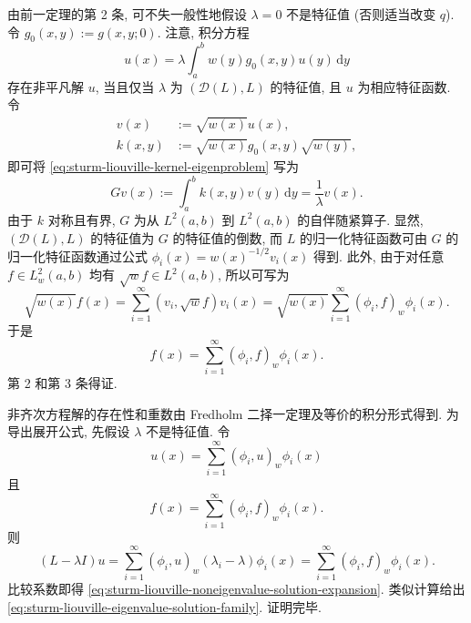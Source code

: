 \begin{Proof}
由前一定理的第 2 条, 可不失一般性地假设 $\lambda=0$ 不是特征值 (否则适当改变 $q$). 令 $g_0(x,y):=g(x,y;0)$. 注意, 积分方程
\begin{equation}\label{eq:sturm-liouville-kernel-eigenproblem}
u(x)=\lambda\int_a^bw(y)g_0(x,y)u(y)\,\mathrm{d}y
\end{equation}
存在非平凡解 $u$, 当且仅当 $\lambda$ 为 $(\mathcal{D}(L),L)$ 的特征值, 且 $u$ 为相应特征函数. 令\[\begin{aligned}
v(x)&:=\sqrt{w(x)}u(x),\\
k(x,y)&:=\sqrt{w(x)}g_0(x,y)\sqrt{w(y)},
\end{aligned}\]即可将 \eqref{eq:sturm-liouville-kernel-eigenproblem} 写为
\begin{equation}\label{eq:sturm-liouville-unweighted-compact-eigenproblem}
Gv(x):=\int_a^bk(x,y)v(y)\,\mathrm{d}y=\dfrac{1}{\lambda}v(x).
\end{equation}
由于 $k$ 对称且有界, $G$ 为从 $L^2(a,b)$ 到 $L^2(a,b)$ 的自伴随紧算子. 显然, $(\mathcal{D}(L),L)$ 的特征值为 $G$ 的特征值的倒数, 而 $L$ 的归一化特征函数可由 $G$ 的归一化特征函数通过公式 $\phi_i(x)=w(x)^{-1/2}v_i(x)$ 得到. 此外, 由于对任意 $f\in L_w^2(a,b)$ 均有 $\sqrt{w}f\in L^2(a,b)$, 所以可写为
\begin{equation}\label{eq:sturm-liouville-weighted-data-basis-expansion}
\sqrt{w(x)}f(x)=\sum_{i=1}^\infty(v_i,\sqrt{w}f)v_i(x)=\sqrt{w(x)}\sum_{i=1}^\infty(\phi_i,f)_w\phi_i(x).
\end{equation}
于是
\begin{equation}\label{eq:sturm-liouville-data-eigenfunction-expansion}
f(x)=\sum_{i=1}^\infty(\phi_i,f)_w\phi_i(x).
\end{equation}
第 2 和第 3 条得证.

非齐次方程解的存在性和重数由 Fredholm 二择一定理及等价的积分形式得到. 为导出展开公式, 先假设 $\lambda$ 不是特征值. 令
\begin{equation}\label{eq:sturm-liouville-solution-basis-expansion}
u(x)=\sum_{i=1}^\infty(\phi_i,u)_w\phi_i(x)
\end{equation}
且
\begin{equation}\label{eq:sturm-liouville-forcing-basis-expansion}
f(x)=\sum_{i=1}^\infty(\phi_i,f)_w\phi_i(x).
\end{equation}
则
\begin{equation}\label{eq:sturm-liouville-equating-spectral-coefficients}
(L-\lambda I)u=\sum_{i=1}^\infty(\phi_i,u)_w(\lambda_i-\lambda)\phi_i(x)=\sum_{i=1}^\infty(\phi_i,f)_w\phi_i(x).
\end{equation}
比较系数即得 \eqref{eq:sturm-liouville-noneigenvalue-solution-expansion}. 类似计算给出 \eqref{eq:sturm-liouville-eigenvalue-solution-family}. 证明完毕.
\end{Proof}
